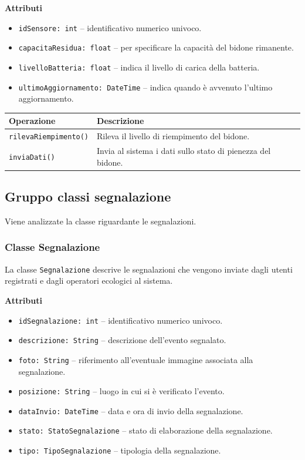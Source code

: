 \documentclass[12pt,a4paper]{article}
\begin{document}
\textbf{Attributi}
\begin{itemize}
    \item \texttt{idSensore: int} -- identificativo numerico univoco.
    \item \texttt{capacitaResidua: float} -- per specificare la capacità del bidone rimanente.
    \item \texttt{livelloBatteria: float} -- indica il livello di carica della batteria.
    \item \texttt{ultimoAggiornamento: DateTime} -- indica quando è avvenuto l'ultimo aggiornamento.
\end{itemize}

\begin{table}[H]
\centering
\begin{tabularx}{\textwidth}{@{}lX@{}}
\toprule
\textbf{Operazione} & \textbf{Descrizione} \\ \midrule
\texttt{rilevaRiempimento()} & Rileva il livello di riempimento del bidone. \\
\texttt{inviaDati()} & Invia al sistema i dati sullo stato di pienezza del bidone. \\
\bottomrule
\end{tabularx}
\end{table}

\subsection{Gruppo classi segnalazione} 
Viene analizzate la classe riguardante le segnalazioni.

\subsubsection{Classe Segnalazione}
La classe \texttt{Segnalazione} descrive le segnalazioni che vengono inviate 
dagli utenti registrati e dagli operatori ecologici al sistema.

\textbf{Attributi}
\begin{itemize}
    \item \texttt{idSegnalazione: int} -- identificativo numerico univoco.
    \item \texttt{descrizione: String} -- descrizione dell'evento segnalato.
    \item \texttt{foto: String} -- riferimento all'eventuale immagine associata alla segnalazione.
    \item \texttt{posizione: String} -- luogo in cui si è verificato l'evento.
    \item \texttt{dataInvio: DateTime} -- data e ora di invio della segnalazione.
    \item \texttt{stato: StatoSegnalazione} -- stato di elaborazione della segnalazione.
    \item \texttt{tipo: TipoSegnalazione} -- tipologia della segnalazione.
\end{itemize}
\end{document}
